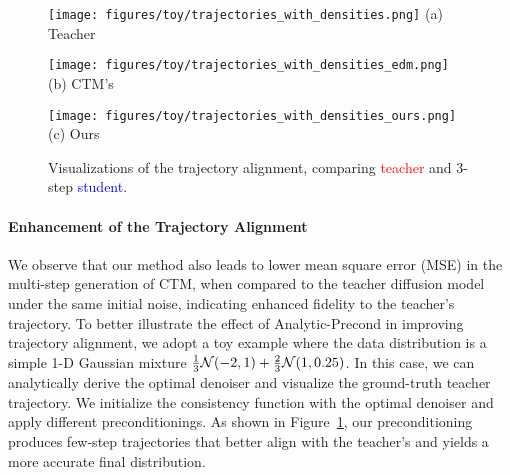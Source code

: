 \begin{figure}[ht]
    \centering
	\begin{minipage}[t]{.32\linewidth}
		\centering
		\texttt{[image: figures/toy/trajectories\_with\_densities.png]}
		\small{(a) Teacher}
	\end{minipage}
	\begin{minipage}[t]{.32\linewidth}
		\centering
		\texttt{[image: figures/toy/trajectories\_with\_densities\_edm.png]}
		\small{(b) CTM's}
	\end{minipage}
        \begin{minipage}[t]{.32\linewidth}
		\centering
		\texttt{[image: figures/toy/trajectories\_with\_densities\_ours.png]}
		\small{(c) Ours}
	\end{minipage}
	\caption{\label{fig:trajectory}Visualizations of the trajectory alignment, comparing \textcolor{red}{teacher} and 3-step \textcolor{blue}{student}.}
	\vspace{-.1in}
\end{figure}
\paragraph{Enhancement of the Trajectory Alignment} We observe that our method also leads to lower mean square error (MSE) in the multi-step generation of CTM, when compared to the teacher diffusion model under the same initial noise, indicating enhanced fidelity to the teacher's trajectory. To better illustrate the effect of Analytic-Precond in improving trajectory alignment, we adopt a toy example where the data distribution is a simple 1-D Gaussian mixture $\frac{1}{3}\mathcal N(-2,1)+\frac{2}{3}\mathcal N(1,0.25)$. In this case, we can analytically derive the optimal denoiser and visualize the ground-truth teacher trajectory. We initialize the consistency function with the optimal denoiser and apply different preconditionings. As shown in Figure~\ref{fig:trajectory}, our preconditioning produces few-step trajectories that better align with the teacher's and yields a more accurate final distribution.